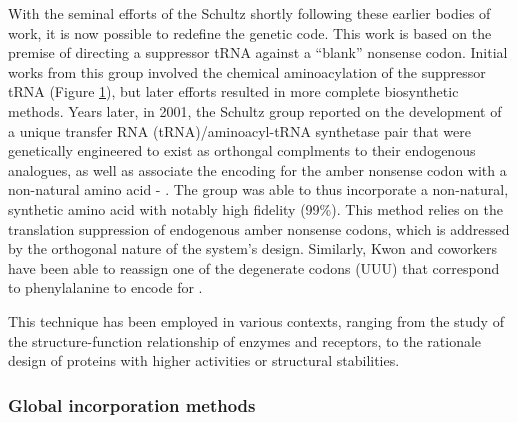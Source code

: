 \begin{refsection}
\begin{figure}[h!]
{    \cite{Noren1989}}\label{fig:schultz_schema} \end{figure}
With the seminal efforts of the Schultz \cite{Noren1989} shortly
following these earlier bodies of work, it is now possible to redefine the
genetic code. This work is based on the premise of directing a suppressor tRNA
against a ``blank'' nonsense codon. Initial works from this group involved the
chemical aminoacylation of the suppressor tRNA  (Figure
\ref{fig:schultz_schema}), but later efforts resulted in more complete
biosynthetic methods.
Years later, in 2001, the Schultz group reported on the development of a unique
transfer RNA (tRNA)/aminoacyl-tRNA synthetase pair that were genetically
engineered to exist as orthongal complments to their endogenous analogues, as
well as associate the encoding for the amber nonsense codon with a non-natural
amino acid - . The group was able to thus
incorporate a non-natural, synthetic amino acid with notably high fidelity
(99\%).\cite{Wang2001} This method relies on the translation suppression of
endogenous amber nonsense codons, which is addressed by the orthogonal nature of
the system's design. Similarly, Kwon and coworkers have been able to reassign
one of the degenerate codons (UUU) that correspond to phenylalanine to encode
for .\cite{Kwon2003}

This technique has been employed in various contexts, ranging from the study of
the structure-function relationship of enzymes and receptors, to the rationale
design of proteins with higher activities or structural stabilities.



\subsubsection{Global incorporation methods} 



\end{refsection}
